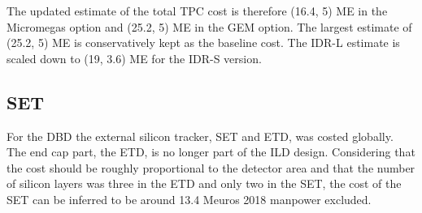 The updated estimate of the total TPC cost is therefore (16.4, 5) ME in the Micromegas option and (25.2, 5) ME in the GEM option. 
The largest estimate of (25.2, 5) ME is conservatively kept as the baseline cost. The IDR-L estimate is scaled down to (19, 3.6) ME for the IDR-S version.

\subsection{SET}
For the DBD the external silicon tracker, SET and ETD, was costed globally. The end cap part, the ETD, is no longer part of the ILD design. Considering that the cost should be roughly proportional to the detector area and that the number of silicon layers was three in the ETD and only two in the SET, the  cost of the SET can be inferred to be around 13.4 Meuros 2018 manpower excluded.

